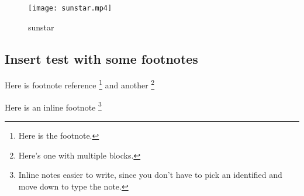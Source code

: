 \documentclass[
]{article}
\begin{document}
\begin{figure}
\centering
\texttt{[image: sunstar.mp4]}
\caption{sunstar}
\end{figure}

\hypertarget{insert-test-with-some-footnotes}{%
\subsection{Insert test with some
footnotes}\label{insert-test-with-some-footnotes}}

Here is footnote reference \footnote{Here is the footnote.} and another
\footnote{Here's one with multiple blocks.}

Here is an inline footnote \footnote{Inline notes easier to write, since
  you don't have to pick an identified and move down to type the note.}
\end{document}
